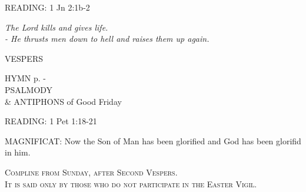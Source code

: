 \noindent\small{\uppercase{READING:}}    1 Jn 2:1b-2 \textbf{   \\}

\begin{center}\small\textit{The Lord kills and gives life.\\
- He thrusts men down to hell and raises them up again.}\end{center}

\begin{flushleft}\normalsize{\uppercase{VESPERS\\}}\end{flushleft}
\small{\uppercase{HYMN} p. \pageref{lent:firstHymn}-\pageref{lent:lastHymn}\\}
\noindent\small{\uppercase{PSALMODY}\\} \& ANTIPHONS of Good Friday

\noindent\small{\uppercase{READING:}}    1 Pet 1:18-21 \textbf{   \\}

\noindent\small{\uppercase{MAGNIFICAT:}}	Now the Son of Man has been glorified and God has been glorifid in him.\\

\begin{center}\small\textsc{Compline from Sunday, after Second Vespers.\\ It is said only by those who do not participate in the Easter Vigil.}\end{center}
